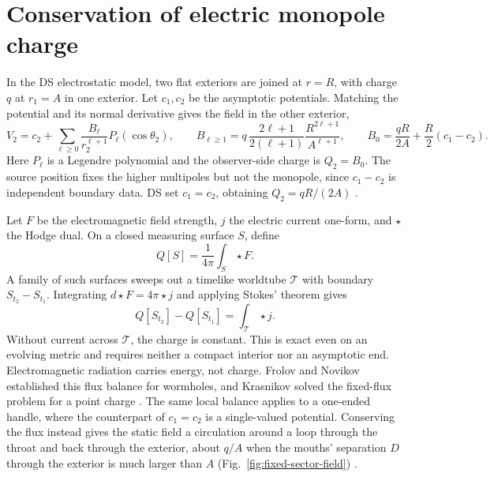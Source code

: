 \documentclass[aps,prd,10pt,onecolumn,nofootinbib,superscriptaddress,floatfix]{revtex4-2}
\begin{document}
\section{Conservation of electric monopole charge}
\label{sec:maxwell}

In the DS electrostatic model, two flat exteriors are joined at $r=R$,
with charge $q$ at $r_1=A$ in one exterior.  Let $c_1,c_2$ be the
asymptotic potentials.  Matching the potential and its normal derivative
gives the field in the other exterior,
\begin{equation}
 V_2=c_2+\sum_{\ell\ge0}\frac{B_\ell}{r_2^{\ell+1}}
 P_\ell(\cos\theta_2),\qquad
 B_{\ell\ge1}=q\,\frac{2\ell+1}{2(\ell+1)}
 \frac{R^{2\ell+1}}{A^{\ell+1}},\qquad
 B_0=\frac{qR}{2A}+\frac{R}{2}(c_1-c_2).
 \label{eq:ds-multipoles}
\end{equation}
Here $P_\ell$ is a Legendre polynomial and the observer-side charge is
$Q_2=B_0$.  The source position fixes the higher multipoles but not the
monopole, since $c_1-c_2$ is independent boundary data.
DS set $c_1=c_2$, obtaining $Q_2=qR/(2A)$
\cite{DaiStojkovic2019Observing}.

Let $F$ be the electromagnetic field strength, $j$ the electric current
one-form, and $\star$ the Hodge dual.  On a closed measuring surface $S$,
define
\begin{equation}
 Q[S]=\frac{1}{4\pi}\int_S\star F.
 \label{eq:maxwell-charge}
\end{equation}
A family of such surfaces sweeps out a timelike worldtube $\mathcal T$
with boundary $S_{t_2}-S_{t_1}$.  Integrating $d\star F=4\pi\star j$
and applying Stokes' theorem gives
\begin{equation}
 Q[S_{t_2}]-Q[S_{t_1}]=\int_{\mathcal T}\star j.
 \label{eq:maxwell-balance}
\end{equation}
Without current across $\mathcal T$, the charge is constant.
This is exact even on an evolving metric and requires neither a compact
interior nor an asymptotic end.  Electromagnetic radiation carries
energy, not charge.  Frolov and Novikov established this flux balance
for wormholes, and Krasnikov solved the fixed-flux problem for a point charge
\cite{FrolovNovikov1990PhysicalEffects,Krasnikov2008ElectrostaticInteraction}.
The same local balance applies to a one-ended handle, where the counterpart
of $c_1=c_2$ is a single-valued potential.  Conserving the flux instead
gives the static field a circulation around a loop through the throat and
back through the exterior, about $q/A$ when the mouths' separation $D$
through the exterior is much larger than $A$
(Fig.~\ref{fig:fixed-sector-field}) \cite{FrolovNovikov1990PhysicalEffects}.
\end{document}
